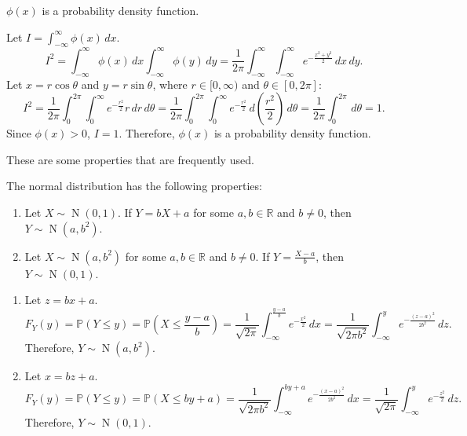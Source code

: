 \documentclass{huhtakm-template-book-v2}
\newcommand{\prob}{\mathbb{P}}
\DeclareMathOperator{\N}{N}
\begin{document}
    \begin{cla}
        $\phi(x)$ is a probability density function.
    \end{cla}
    \begin{proofing}
        Let $I = \int_{-\infty}^{\infty}\phi(x)\,dx$.
        \begin{equation*}
            I^{2} = \int_{-\infty}^{\infty}\phi(x)\,dx\int_{-\infty}^{\infty}\phi(y)\,dy = \frac{1}{2\pi}\int_{-\infty}^{\infty}\int_{-\infty}^{\infty} e^{-\frac{x^{2}+y^{2}}{2}}\,dx\,dy.
        \end{equation*}
        Let $x = r\cos\theta$ and $y = r\sin\theta$, where $r \in [0,\infty)$ and $\theta \in [0,2\pi]$:
        \begin{equation*}
            I^{2} = \frac{1}{2\pi}\int_{0}^{2\pi}\int_{0}^{\infty}e^{-\frac{r^{2}}{2}}r\,dr\,d\theta = \frac{1}{2\pi}\int_{0}^{2\pi}\int_{0}^{\infty}e^{-\frac{r^{2}}{2}}\,d\left(\frac{r^{2}}{2}\right)\,d\theta = \frac{1}{2\pi}\int_{0}^{2\pi}\,d\theta = 1.
        \end{equation*}
        Since $\phi(x) > 0$, $I = 1$. Therefore, $\phi(x)$ is a probability density function.
    \end{proofing}
    These are some properties that are frequently used.
    \begin{lem}
        \label{Chapter 5 (Lemma) Properties of Normal Distribution}
        The normal distribution has the following properties:
        \begin{enumerate}
            \item Let $X \sim \N(0,1)$. If $Y = bX+a$ for some $a,b \in \mathbb{R}$ and $b \neq 0$, then $Y \sim \N(a,b^{2})$.
            \item Let $X \sim \N(a,b^{2})$ for some $a,b \in \mathbb{R}$ and $b \neq 0$. If $Y = \frac{X-a}{b}$, then $Y \sim \N(0,1)$.
        \end{enumerate}
    \end{lem}
    \begin{proofing}
        \begin{enumerate}
            \item Let $z = bx+a$.
            \begin{equation*}
                F_{Y}(y) = \prob(Y \leq y) = \prob\left(X \leq \frac{y-a}{b}\right) = \frac{1}{\sqrt{2\pi}}\int_{-\infty}^{\frac{y-a}{b}}e^{-\frac{x^{2}}{2}}\,dx = \frac{1}{\sqrt{2\pi b^{2}}}\int_{-\infty}^{y}e^{-\frac{(z-a)^{2}}{2b^{2}}}\,dz.
            \end{equation*}
            Therefore, $Y \sim \N(a,b^{2})$.
            \item Let $x = bz+a$.
            \begin{equation*}
                F_{Y}(y) = \prob(Y \leq y) = \prob(X \leq by+a) = \frac{1}{\sqrt{2\pi b^{2}}}\int_{-\infty}^{by+a}e^{-\frac{(x-a)^{2}}{2b^{2}}}\,dx = \frac{1}{\sqrt{2\pi}}\int_{-\infty}^{y}e^{-\frac{z^{2}}{2}}\,dz.
            \end{equation*}
            Therefore, $Y \sim \N(0,1)$.
        \end{enumerate}
    \end{proofing}
    \newpage
\end{document}
